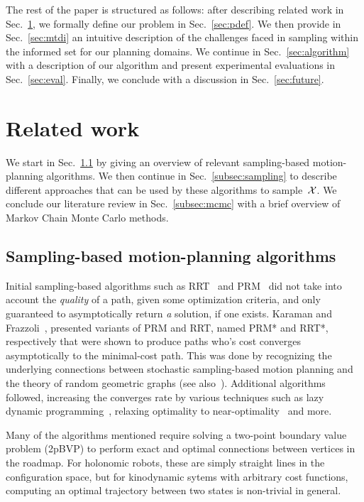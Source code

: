 \documentclass[letterpaper, 10 pt, conference]{ieeeconf}  %
\begin{document}
The rest of the paper is structured as follows: after describing related work in Sec.~\ref{sec:related_work}, we formally define our problem in Sec.~\ref{sec:pdef}.
We then provide in Sec.~\ref{sec:mtdi} an intuitive description of the challenges faced in sampling within the informed set for our planning domains.
We continue in Sec.~\ref{sec:algorithm} with a description of our algorithm and present experimental evaluations in Sec.~\ref{sec:eval}.
Finally, we conclude with a discussion in Sec.~\ref{sec:future}.


\section{Related work}
\label{sec:related_work}
We start in Sec.~\ref{subsec:planning} by giving an overview of relevant sampling-based motion-planning algorithms.
We then continue in Sec.~\ref{subsec:sampling} to describe different approaches that can be used by  these algorithms to sample~$\mathcal{X}$.
We conclude our literature review in Sec.~\ref{subsec:mcmc} with a brief overview of Markov Chain Monte Carlo methods.

\subsection{Sampling-based motion-planning algorithms}
\label{subsec:planning}
Initial sampling-based algorithms such as RRT~\cite{LK01} and PRM~\cite{KSLO96} did not take into account the \emph{quality} of a path, given some optimization criteria, and only guaranteed to asymptotically return \emph{a} solution, if one exists.
Karaman and Frazzoli~\cite{KF11}, presented variants of PRM and RRT, named PRM* and RRT*, respectively that were shown to produce paths who's cost converges asymptotically to the minimal-cost path.
This was done by recognizing the underlying connections between stochastic sampling-based motion planning and the theory of random geometric graphs (see also~\cite{SSH16}).
Additional algorithms followed, increasing the converges rate by various techniques such as 
lazy dynamic programming~\cite{GSB15, JSCP15, SH15},
relaxing optimality to near-optimality~\cite{DB14, SH16} 
and more.

Many of the algorithms mentioned require solving a two-point boundary value problem (2pBVP) to perform exact and optimal connections between vertices in the roadmap.
For holonomic robots, these are simply straight lines in the configuration space, but for kinodynamic sytems with arbitrary cost functions,  computing an optimal trajectory between two states is non-trivial in general.
\end{document}

